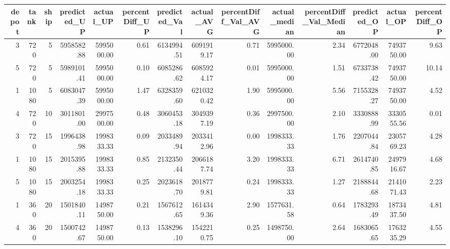 \begin{tabular}{rrrrrrrrrrrrrr}
\toprule
 depot &  tank &  ship &  predicted\_UP &  actual\_UP &  percentDiff\_UP &  predicted\_Val &  actual\_AVG &  percentDiff\_Val\_AVG &  actual\_median &  percentDiff\_Val\_Median &  predicted\_OP &  actual\_OP &  percentDiff\_OP \\
\midrule
     3 &   720 &     5 &    5958582.88 & 5995000.00 &            0.61 &     6134994.51 &  6091919.17 &                 0.71 &     5995000.00 &                    2.34 &    6772048.00 & 7493750.00 &            9.63 \\
     5 &   720 &     5 &    5989101.41 & 5995000.00 &            0.10 &     6085286.62 &  6085924.17 &                 0.01 &     5995000.00 &                    1.51 &    6733738.42 & 7493750.00 &           10.14 \\
     1 &  1080 &     5 &    6083047.39 & 5995000.00 &            1.47 &     6328359.60 &  6210320.42 &                 1.90 &     5995000.00 &                    5.56 &    7155328.27 & 7493750.00 &            4.52 \\
     4 &   720 &    10 &    3011801.00 & 2997500.00 &            0.48 &     3060453.18 &  3049397.19 &                 0.36 &     2997500.00 &                    2.10 &    3330888.99 & 3330555.56 &            0.01 \\
     3 &   720 &    15 &    1996438.98 & 1998333.33 &            0.09 &     2033489.94 &  2033412.96 &                 0.00 &     1998333.33 &                    1.76 &    2207044.84 & 2305769.23 &            4.28 \\
     1 &  1080 &    15 &    2015395.88 & 1998333.33 &            0.85 &     2132350.44 &  2066187.74 &                 3.20 &     1998333.33 &                    6.71 &    2614740.85 & 2497916.67 &            4.68 \\
     5 &  1080 &    15 &    2003254.18 & 1998333.33 &            0.25 &     2023618.70 &  2018779.81 &                 0.24 &     1998333.33 &                    1.27 &    2188844.68 & 2141071.43 &            2.23 \\
     1 &   360 &    20 &    1501840.11 & 1498750.00 &            0.21 &     1567612.65 &  1614349.36 &                 2.90 &     1577631.58 &                    0.64 &    1783293.49 & 1873437.50 &            4.81 \\
     4 &   360 &    20 &    1500742.67 & 1498750.00 &            0.13 &     1538296.10 &  1542210.75 &                 0.25 &     1498750.00 &                    2.64 &    1683065.65 & 1763235.29 &            4.55 \\

\end{tabular}
